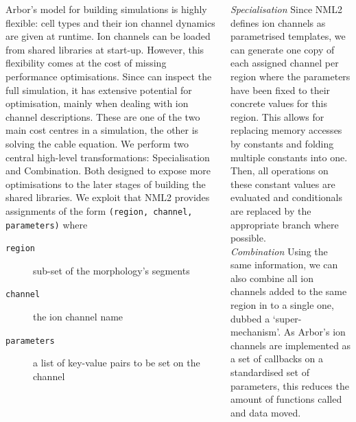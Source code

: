 \documentclass{beamer}
\begin{document}
\begin{frame}[t, fragile]
\begin{columns}[t]
\begin{column}{0.49\textwidth}
      Arbor's model for building simulations is highly flexible: cell types and
      their ion channel dynamics are given at runtime. Ion channels can be
      loaded from shared libraries at start-up. However, this flexibility comes
      at the cost of missing performance optimisations. Since \nmlcc{} can
      inspect the full simulation, it has extensive potential for optimisation,
      mainly when dealing with ion channel descriptions. These are one of the
      two main cost centres in a simulation, the other is solving the cable
      equation. We perform two central high-level transformations:
      Specialisation and Combination. Both designed to expose more optimisations
      to the later stages of building the shared libraries. We exploit that NML2
      provides assignments of the form \verb!(region, channel, parameters)!
      where
      \begin{description}
        \item[\texttt{region}] sub-set of the morphology's segments
        \item[\texttt{channel}] the ion channel name
        \item[\texttt{parameters}] a list of key-value pairs to be set on the channel
      \end{description}
    \end{column}
    \begin{column}{0.49\textwidth}
      \emph{Specialisation} Since NML2 defines ion channels as parametrised
      templates, we can generate one copy of each assigned channel per region
      where the parameters have been fixed to their concrete values for this
      region. This allows for replacing memory accesses by constants and folding
      multiple constants into one. Then, all operations on these constant values
      are evaluated and conditionals are replaced by the appropriate branch
      where possible.\\[1.5ex]
      \emph{Combination} Using the same information, we can also combine all ion
      channels added to the same region in to a single one, dubbed a
      `super-mechanism'. As Arbor's ion channels are implemented as a set of
      callbacks on a standardised set
      of parameters, this reduces the amount of functions called and data moved.\\[1.5ex]


\end{column}
\end{columns}
\end{frame}
\end{document}
